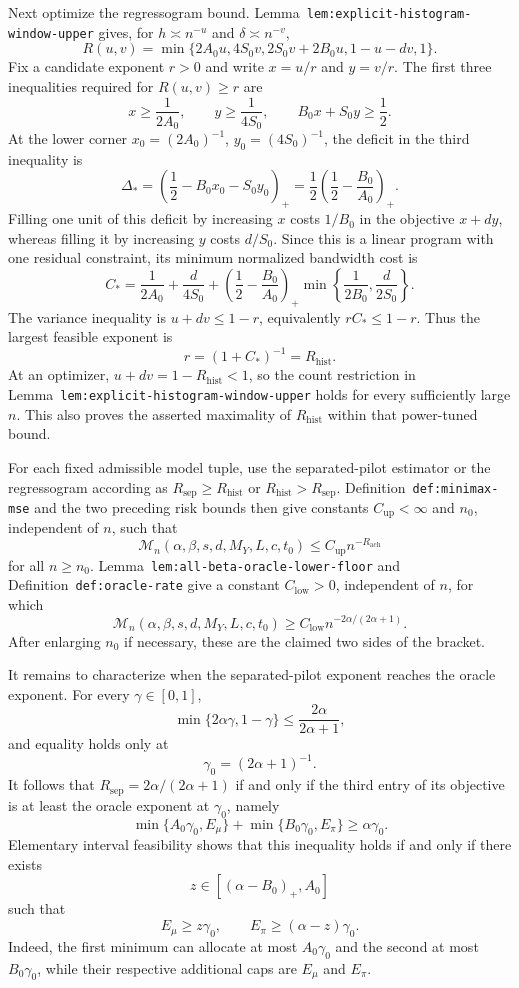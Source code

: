 Next optimize the regressogram bound. Lemma~\texttt{lem:explicit-histogram-window-upper} gives, for \(h\asymp n^{-u}\) and \(\delta\asymp n^{-v}\),
\[
R(u,v)=\min\{2A_0u,4S_0v,2S_0v+2B_0u,1-u-dv,1\}.
\]
Fix a candidate exponent \(r>0\) and write \(x=u/r\) and \(y=v/r\). The first three inequalities required for \(R(u,v)\ge r\) are
\[
x\ge\frac{1}{2A_0},
\qquad y\ge\frac{1}{4S_0},
\qquad B_0x+S_0y\ge\frac12.
\]
At the lower corner \(x_0=(2A_0)^{-1}\), \(y_0=(4S_0)^{-1}\), the deficit in the third inequality is
\[
\Delta_*=\left(\frac12-B_0x_0-S_0y_0\right)_+
=\frac12\left(\frac12-\frac{B_0}{A_0}\right)_+.
\]
Filling one unit of this deficit by increasing \(x\) costs \(1/B_0\) in the objective \(x+dy\), whereas filling it by increasing \(y\) costs \(d/S_0\). Since this is a linear program with one residual constraint, its minimum normalized bandwidth cost is
\[
C_*=\frac1{2A_0}+\frac d{4S_0}+\left(\frac12-\frac{B_0}{A_0}\right)_+
\min\left\{\frac1{2B_0},\frac d{2S_0}\right\}.
\]
The variance inequality is \(u+dv\le1-r\), equivalently \(rC_*\le1-r\). Thus the largest feasible exponent is
\[
r=(1+C_*)^{-1}=R_{\mathrm{hist}}.
\]
At an optimizer, \(u+dv=1-R_{\mathrm{hist}}<1\), so the count restriction in Lemma~\texttt{lem:explicit-histogram-window-upper} holds for every sufficiently large \(n\). This also proves the asserted maximality of \(R_{\mathrm{hist}}\) within that power-tuned bound.

For each fixed admissible model tuple, use the separated-pilot estimator or the regressogram according as \(R_{\mathrm{sep}}\ge R_{\mathrm{hist}}\) or \(R_{\mathrm{hist}}>R_{\mathrm{sep}}\). Definition~\texttt{def:minimax-mse} and the two preceding risk bounds then give constants \(C_{\mathrm{up}}<\infty\) and \(n_0\), independent of \(n\), such that
\[
\mathcal M_n(\alpha,\beta,s,d,M_Y,L,c,t_0)
\le C_{\mathrm{up}}n^{-R_{\mathrm{ach}}}
\]
for all \(n\ge n_0\). Lemma~\texttt{lem:all-beta-oracle-lower-floor} and Definition~\texttt{def:oracle-rate} give a constant \(C_{\mathrm{low}}>0\), independent of \(n\), for which
\[
\mathcal M_n(\alpha,\beta,s,d,M_Y,L,c,t_0)
\ge C_{\mathrm{low}}n^{-2\alpha/(2\alpha+1)}.
\]
After enlarging \(n_0\) if necessary, these are the claimed two sides of the bracket.

It remains to characterize when the separated-pilot exponent reaches the oracle exponent. For every \(\gamma\in[0,1]\),
\[
\min\{2\alpha\gamma,1-\gamma\}
\le\frac{2\alpha}{2\alpha+1},
\]
and equality holds only at
\[
\gamma_0=(2\alpha+1)^{-1}.
\]
It follows that \(R_{\mathrm{sep}}=2\alpha/(2\alpha+1)\) if and only if the third entry of its objective is at least the oracle exponent at \(\gamma_0\), namely
\[
\min\{A_0\gamma_0,E_\mu\}+\min\{B_0\gamma_0,E_\pi\}
\ge\alpha\gamma_0.
\]
Elementary interval feasibility shows that this inequality holds if and only if there exists
\[
z\in[(\alpha-B_0)_+,A_0]
\]
such that
\[
E_\mu\ge z\gamma_0,
\qquad E_\pi\ge(\alpha-z)\gamma_0.
\]
Indeed, the first minimum can allocate at most \(A_0\gamma_0\) and the second at most \(B_0\gamma_0\), while their respective additional caps are \(E_\mu\) and \(E_\pi\).

